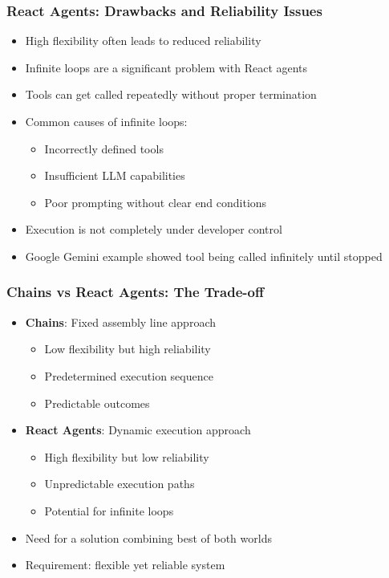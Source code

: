 \begin{frame}[fragile]\frametitle{React Agents: Drawbacks and Reliability Issues}
      \begin{itemize}
        \item High flexibility often leads to reduced reliability
        \item Infinite loops are a significant problem with React agents
        \item Tools can get called repeatedly without proper termination
        \item Common causes of infinite loops:
        \begin{itemize}
            \item Incorrectly defined tools
            \item Insufficient LLM capabilities
            \item Poor prompting without clear end conditions
        \end{itemize}
        \item Execution is not completely under developer control
        \item Google Gemini example showed tool being called infinitely until stopped
      \end{itemize}
\end{frame}

\begin{frame}[fragile]\frametitle{Chains vs React Agents: The Trade-off}
      \begin{itemize}
        \item \textbf{Chains}: Fixed assembly line approach
        \begin{itemize}
            \item Low flexibility but high reliability
            \item Predetermined execution sequence
            \item Predictable outcomes
        \end{itemize}
        \item \textbf{React Agents}: Dynamic execution approach
        \begin{itemize}
            \item High flexibility but low reliability
            \item Unpredictable execution paths
            \item Potential for infinite loops
        \end{itemize}
        \item Need for a solution combining best of both worlds
        \item Requirement: flexible yet reliable system
      \end{itemize}
\end{frame}

